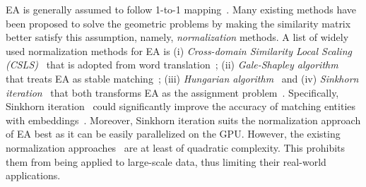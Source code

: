 EA is generally assumed to follow 1-to-1 mapping~\cite{MTransE17}. 
Many existing methods have been proposed to solve the geometric problems by making the similarity matrix better satisfy this assumption, namely, \emph{normalization} methods.
A list of widely used normalization methods for EA is (i) \emph{Cross-domain Similarity Local Scaling (CSLS)}~\cite{CSLS} that is adopted from word translation~\cite{TransEdge19,EVA20, RREA20, EASY21}; (ii) \emph{Gale-Shapley algorithm}~\cite{GaleShapley} that treats EA as stable matching~\cite{CEAFF20,CEAFF21}; (iii) \emph{Hungarian algorithm}~\cite{Hungarian1955} and (iv) \emph{Sinkhorn iteration}~\cite{Sinkhorn13} that both transforms EA as the assignment problem~\cite{DGMC20, SEU21, EASY21}.
Specifically, Sinkhorn iteration~\cite{Sinkhorn13} could significantly improve the accuracy of matching entities with embeddings~\cite{EASY21, SEU21}. Moreover, Sinkhorn iteration suits the normalization approach of EA best as it can be easily parallelized on the GPU. %
However, the existing normalization approaches~\cite{CSLS,Sinkhorn13, GaleShapley, Hungarian1955} are at least of quadratic complexity. This prohibits them from being applied to large-scale data, thus limiting their real-world applications.


